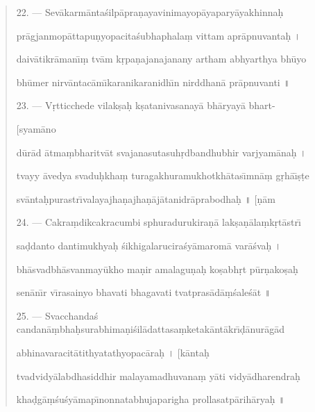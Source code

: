 \documentclass[a4paper, 11pt, oneside, french, landscape, twocolumn]{article}
\begin{document}
\begin{quotation}
22. --- Sev\={a}karm\={a}nta\'{s}ilp\={a}pra\d{n}ayavinimayop\={a}yapary\={a}yakhinna\d{h}

pr\={a}gjanmop\={a}ttapu\d{n}yopacita\'{s}ubhaphala\d{m} vittam apr\={a}pnuvanta\d{h} \texthindi{।}

daiv\={a}tikr\={a}man\={\i}\d{m} tv\={a}m k\d{r}pa\d{n}ajanajanany artham abhyarthya bh\={u}yo

bh\={u}mer nirv\={a}ntac\={a}m\={\i}karanikaranidh\={\i}n nirddhan\={a} pr\={a}pnuvanti \texthindi{॥}

\bigskip

23. --- V\d{r}tticchede vilak\d{s}a\d{h} k\d{s}atanivasanay\={a} bh\={a}ryay\={a} bhart-

\hspace*{55mm}[syam\={a}no

d\={u}r\={a}d \={a}tma\d{m}bharitv\={a}t svajanasutasuh\d{r}dbandhubhir varjyam\={a}na\d{h} \texthindi{।}

tvayy \={a}vedya svadu\d{h}kha\d{m} turagakhuramukhotkh\={a}tas\={\i}mn\={a}\d{m} g\d{r}h\={a}\={\i}\d{s}\d{t}e

sv\={a}nta\d{h}purastr\={\i}valayajha\d{n}ajha\d{n}\={a}j\={a}tanidr\={a}prabodha\d{h} \texthindi{॥} [\d{n}\={a}m

\bigskip

24. --- Cakra\d{m}dikcakracumbi sphuradurukira\d{n}\={a} lak\d{s}a\d{n}\={a}la\d{m}k\d{r}t\={a}str\={\i}

sa\d{d}danto dantimukhya\d{h} \'{s}ikhigalarucira\'{s}y\={a}marom\={a} var\={a}\'{s}va\d{h} \texthindi{।}

bh\={a}svadbh\={a}svanmay\={u}kho ma\d{n}ir amalagu\d{n}a\d{h} ko\d{s}abh\d{r}t p\={u}r\d{n}ako\d{s}a\d{h}

sen\={a}n\={\i}r v\={\i}rasainyo bhavati bhagavati tvatpras\={a}d\={a}\d{m}\'{s}ale\'{s}\={a}t \texthindi{॥}

\bigskip

25. --- Svacchanda\'{s} candan\={a}\d{m}bha\d{h}surabhima\d{n}i\'{s}il\={a}dattasa\d{m}ketak\={a}nt\={a}kr\={\i}\d{d}\={a}nur\={a}g\={a}d

abhinavaracit\={a}tithyatathyopac\={a}ra\d{h} \texthindi{।} [k\={a}nta\d{h}

tvadvidy\={a}labdhasiddhir malayamadhuvana\d{m} y\={a}ti vidy\={a}dharendra\d{h}

kha\d{d}g\={a}\d{m}\'{s}u\'{s}y\={a}map\={\i}nonnatabhujaparigha prollasatp\={a}rih\={a}rya\d{h} \texthindi{॥}

\bigskip


\end{quotation}
\end{document}
